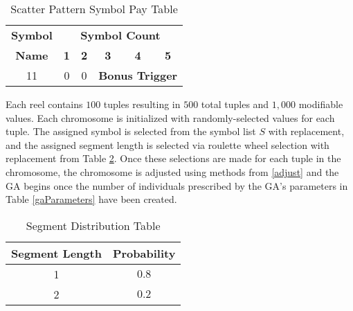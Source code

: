 \documentclass[conference]{IEEEtran}
\begin{document}
\begin{table}[htbp]
\caption{Scatter Pattern Symbol Pay Table}
\begin{center}
\begin{tabular}{|c|c|c|c|c|c|}
\hline
\textbf{Symbol}&\multicolumn{5}{|c|}{\textbf{Symbol Count}} \\
\cline{2-6} 
\textbf{Name} & \textbf{1}& \textbf{2}& \textbf{3}& \textbf{4}& \textbf{5} \\
\hline
11& 0 & 0 &\multicolumn{3}{|c|}{\textbf{Bonus Trigger}}  \\
\hline
\end{tabular}
\label{scatterPays}
\end{center}
\end{table}
Each reel contains $100$ tuples resulting in $500$ total tuples and $1,000$ modifiable values.
Each chromosome is initialized with randomly-selected values for each tuple.
The assigned symbol is selected from the symbol list $S$ with replacement, and the assigned segment length is selected via roulette wheel selection with replacement from Table \ref{segmentLength}.
Once these selections are made for each tuple in the chromosome, the chromosome is adjusted using methods from \ref{adjust} and the GA begins once the number of individuals prescribed by the GA's parameters in Table \ref{gaParameters} have been created.
\begin{table}[htbp]
\caption{Segment Distribution Table}
\begin{center}
\begin{tabular}{|c|c|}
\hline
\textbf{Segment Length}&\textbf{Probability} \\
\hline
1 & $0.8$ \\
\hline
2 & $0.2$  \\
\hline
\end{tabular}
\label{segmentLength}
\end{center}
\end{table}
\end{document}
